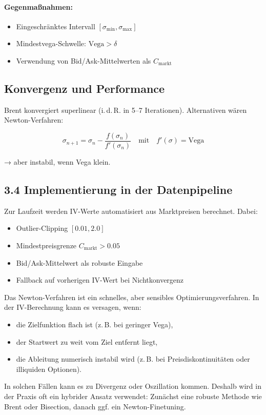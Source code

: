 \documentclass[a4paper,12pt]{article}
\begin{document}
\paragraph{Gegenmaßnahmen:}
\begin{itemize}
  \item Eingeschränktes Intervall $[\sigma_{\min}, \sigma_{\max}]$
  \item Mindestvega-Schwelle: $\text{Vega} > \delta$
  \item Verwendung von Bid/Ask-Mittelwerten als $C_{\text{markt}}$
\end{itemize}

\subsection*{Konvergenz und Performance}
Brent konvergiert superlinear (i.\,d.\,R. in 5–7 Iterationen). Alternativen wären Newton-Verfahren:

\[
\sigma_{n+1} = \sigma_n - \frac{f(\sigma_n)}{f'(\sigma_n)}
\quad \text{mit} \quad f'(\sigma) = \text{Vega}
\]

→ aber instabil, wenn Vega klein.

\subsection*{3.4 Implementierung in der Datenpipeline}

Zur Laufzeit werden IV-Werte automatisiert aus Marktpreisen berechnet. Dabei:

\begin{itemize}
  \item Outlier-Clipping $[0.01, 2.0]$
  \item Mindestpreisgrenze $C_{\text{markt}} > 0.05$
  \item Bid/Ask-Mittelwert als robuste Eingabe
  \item Fallback auf vorherigen IV-Wert bei Nichtkonvergenz
\end{itemize}
\begin{tcolorbox}[colback=yellow!5!white,colframe=yellow!80!black,title=Warnhinweis: Newton-Verfahren kann instabil werden]    Das Newton-Verfahren ist ein schnelles, aber sensibles Optimierungsverfahren. In der IV-Berechnung kann es versagen, wenn:
    \begin{itemize}
      \item die Zielfunktion flach ist (z.\,B. bei geringer Vega),
      \item der Startwert zu weit vom Ziel entfernt liegt,
      \item die Ableitung numerisch instabil wird (z.\,B. bei Preisdiskontinuitäten oder illiquiden Optionen).
    \end{itemize}
    In solchen Fällen kann es zu Divergenz oder Oszillation kommen. Deshalb wird in der Praxis oft ein hybrider Ansatz verwendet: Zunächst eine robuste Methode wie Brent oder Bisection, danach ggf. ein Newton-Finetuning.
    \end{tcolorbox}
    
\end{document}
